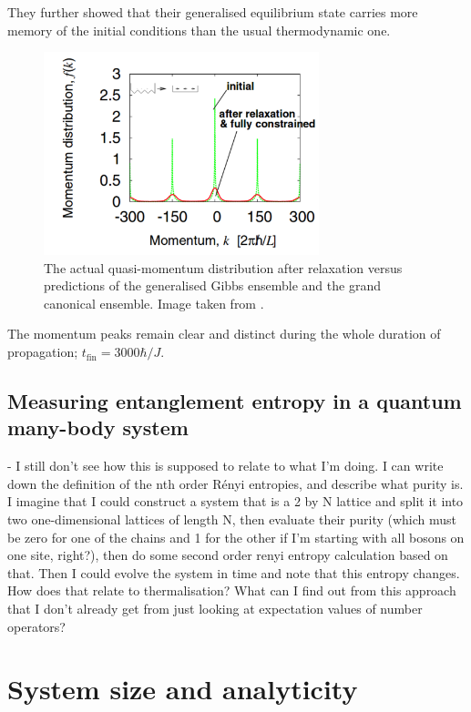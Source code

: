 \documentclass[a4paper, 10pt, draft]{article}
\theoremstyle{plain}
\begin{document}
They further showed that their generalised equilibrium state carries more memory
of the initial conditions than the usual thermodynamic one.
\begin{figure}[H]
    \begin{center}
        \includegraphics[width=8cm]{after_relaxation_rigol}
    \end{center}
    \caption{The actual quasi-momentum distribution after relaxation versus
             predictions of the generalised Gibbs ensemble and the grand
             canonical ensemble. Image taken from \cite{Rigol2007}.}
 \end{figure}

The momentum peaks remain clear and distinct during the whole duration  of
propagation; $t_{\text{fin}} = 3000 \hbar/J$.

\subsection{Measuring entanglement entropy in a quantum many-body system}

- I still don't see how this is supposed to relate to what I'm doing.
I can write down the definition of the nth order R\'enyi entropies, and
describe what purity is. I imagine that I could construct a system that is a
2 by N lattice and split it into two one-dimensional lattices of length N,
then evaluate their purity (which must be zero for one of the chains and 1 for
the other if I'm starting with all bosons on one site, right?), then do some
second order renyi entropy calculation based on that. Then I could evolve the
system in time and note that this entropy changes. How does that relate to
thermalisation? What can I find out from this approach that I don't already
get from just looking at expectation values of number operators?

\newpage

\section{System size and analyticity}
\end{document}
